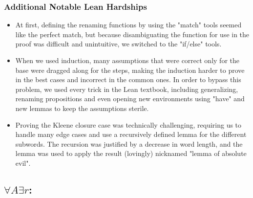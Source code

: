 \documentclass[]{article}
\begin{document}
\subsubsection{Additional Notable Lean Hardships}
\begin{itemize}
	\item 
	At first, defining the renaming functions by using the "match" tools seemed like the perfect match, but because disambiguating the function for use in the proof was difficult and unintuitive, we switched to the "if/else" tools.
	\item 
	When we used induction, many assumptions that were correct only for the base were dragged along for the steps, making the induction harder to prove in the best cases and incorrect in the common ones. In order to bypass this problem, we used every trick in the Lean textbook, including generalizing, renaming propositions and even opening new environments using "have" and new lemmas to keep the assumptions sterile.
	\item 
	Proving the Kleene closure case was technically challenging, requiring us to handle many edge cases and use a recursively defined lemma for the different subwords. The recursion was justified by a decrease in word length, and the lemma was used to apply the result (lovingly) nicknamed "lemma of absolute evil".
\end{itemize}
\subsection{$\forall A \exists r$:}
\end{document}

